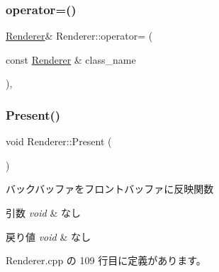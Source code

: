 \subsubsection{\texorpdfstring{operator=()}{operator=()}}
{\footnotesize\ttfamily \mbox{\hyperlink{class_renderer}{Renderer}}\& Renderer\+::operator= (\begin{DoxyParamCaption}\item[{const \mbox{\hyperlink{class_renderer}{Renderer}} \&}]{class\+\_\+name }\end{DoxyParamCaption})\hspace{0.3cm}{\ttfamily [private]}, {\ttfamily [delete]}}

\mbox{\label{class_renderer_a1dac4baae1fa79166442b0778a9c8728}} 
\subsubsection{\texorpdfstring{Present()}{Present()}}
{\footnotesize\ttfamily void Renderer\+::\+Present (\begin{DoxyParamCaption}{ }\end{DoxyParamCaption})}



バックバッファをフロントバッファに反映関数 


\begin{DoxyParams}{引数}
{\em void} & なし \\
\hline
\end{DoxyParams}

\begin{DoxyRetVals}{戻り値}
{\em void} & なし \\
\hline
\end{DoxyRetVals}


 Renderer.\+cpp の 109 行目に定義があります。

